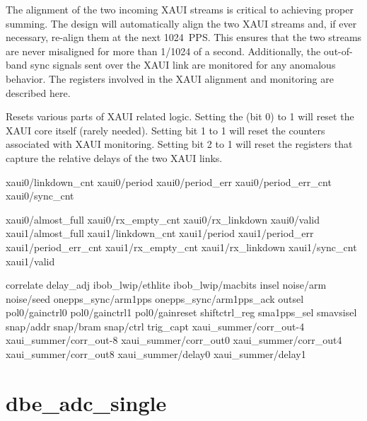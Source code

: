 \documentclass[12pt]{article}
\begin{document}
The alignment of the two incoming XAUI streams is critical to achieving proper
summing.  The design will automatically align the two XAUI streams and, if ever
necessary, re-align them at the next 1024~PPS.  This ensures that the two
streams are never misaligned for more than 1/1024 of a second.  Additionally,
the out-of-band sync signals sent over the XAUI link are monitored for any
anomalous behavior.  The registers involved in the XAUI alignment and
monitoring are described here.

\begin{description}
  Resets various parts of XAUI related logic.  Setting the
\LSb (bit 0) to 1 will reset the XAUI core itself (rarely needed).  Setting bit
1 to 1 will reset the counters associated with XAUI monitoring.  Setting bit 2
to 1 will reset the registers that capture the relative delays of the two XAUI
links.
\end{description}

{}xaui0/linkdown\_cnt
xaui0/period
xaui0/period\_err
xaui0/period\_err\_cnt
xaui0/sync\_cnt

{}xaui0/almost\_full
xaui0/rx\_empty\_cnt
xaui0/rx\_linkdown
xaui0/valid
xaui1/almost\_full
xaui1/linkdown\_cnt
xaui1/period
xaui1/period\_err
xaui1/period\_err\_cnt
xaui1/rx\_empty\_cnt
xaui1/rx\_linkdown
xaui1/sync\_cnt
xaui1/valid

{}correlate
delay\_adj
ibob\_lwip/ethlite
ibob\_lwip/macbits
insel
noise/arm
noise/seed
onepps\_sync/arm1pps
onepps\_sync/arm1pps\_ack
outsel
pol0/gainctrl0
pol0/gainctrl1
pol0/gainreset
shiftctrl\_reg
sma1pps\_sel
smavsisel
snap/addr
snap/bram
snap/ctrl
trig\_capt
xaui\_summer/corr\_out-4
xaui\_summer/corr\_out-8
xaui\_summer/corr\_out0
xaui\_summer/corr\_out4
xaui\_summer/corr\_out8
xaui\_summer/delay0
xaui\_summer/delay1


\section{dbe\_adc\_single}
\end{document}

